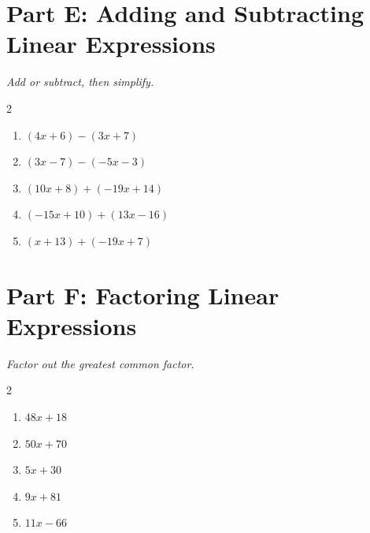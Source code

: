 \documentclass[11pt]{article}
\begin{document}
\section*{Part E: Adding and Subtracting Linear Expressions}
\noindent\textit{Add or subtract, then simplify.}
\begin{multicols}{2}
\begin{enumerate}
  \item $(4x + 6) - (3x + 7)$
  \vspace{1.4cm}
  \item $(3x - 7) - (-5x - 3)$
  \vspace{1.4cm}
  \item $(10x + 8) + (-19x + 14)$
  \vspace{1.4cm}
  \item $(-15x + 10) + (13x - 16)$
  \vspace{1.4cm}
  \item $(x + 13) + (-19x + 7)$
  \vspace{1.4cm}
\end{enumerate}
\end{multicols}

\section*{Part F: Factoring Linear Expressions}
\noindent\textit{Factor out the greatest common factor.}
\begin{multicols}{2}
\begin{enumerate}
  \item $48x + 18$
  \vspace{1.3cm}
  \item $50x + 70$
  \vspace{1.3cm}
  \item $5x + 30$
  \vspace{1.3cm}
  \item $9x + 81$
  \vspace{1.3cm}
  \item $11x - 66$
  \vspace{1.3cm}
\end{enumerate}
\end{multicols}
\end{document}
